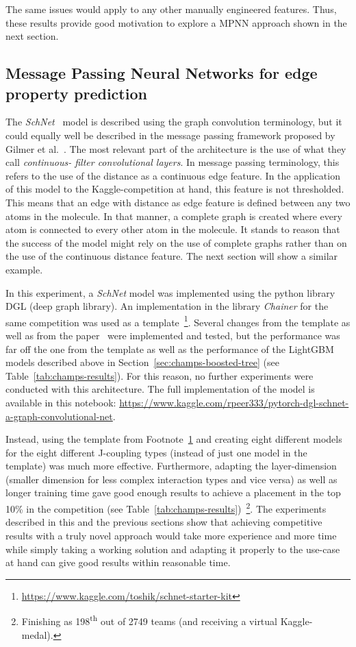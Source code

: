 The same issues would apply to any other manually engineered features. Thus, these results provide good motivation to explore a MPNN approach shown in the next section.


\subsection{Message Passing Neural Networks for edge property prediction}
\label{sec:schnet}

The \textit{SchNet}~\cite{Schutt2017} model is described using the graph convolution terminology, but it could equally well be described in the message passing framework proposed by Gilmer et al.~\cite{Gilmer2017}. The most relevant part of the architecture is the use of what they call \textit{continuous- filter convolutional layers}. In message passing terminology, this refers to the use of the distance as a continuous edge feature. In the application of this model to the Kaggle-competition at hand, this feature is not thresholded. This means that an edge with distance as edge feature is defined between any two atoms in the molecule. In that manner, a complete graph is created where every atom is connected to every other atom in the molecule. It stands to reason that the success of the model might rely on the use of complete graphs rather than on the use of the continuous distance feature. The next section will show a similar example.

In this experiment, a \textit{SchNet} model was implemented using the python library DGL (deep graph library). An implementation in the library \textit{Chainer} for the same competition was used as a template~\footnote{\label{fn:chainer-schnet}\url{https://www.kaggle.com/toshik/schnet-starter-kit}}. Several changes from the template as well as from the paper~\cite{Schutt2017} were implemented and tested, but the performance was far off the one from the template as well as the performance of the LightGBM models described above in Section~\ref{sec:champs-boosted-tree} (see Table~\ref{tab:champs-results}). For this reason, no further experiments were conducted with this architecture. The full implementation of the model is available in this notebook: \url{https://www.kaggle.com/rpeer333/pytorch-dgl-schnet-a-graph-convolutional-net}.

Instead, using the template from Footnote~\ref{fn:chainer-schnet} and creating eight different models for the eight different J-coupling types (instead of just one model in the template) was much more effective. Furthermore, adapting the layer-dimension (smaller dimension for less complex interaction types and vice versa) as well as longer training time gave good enough results to achieve a placement in the top 10\% in the competition (see Table~\ref{tab:champs-results})~\footnote{
	Finishing as 198\textsuperscript{th} out of 2749 teams (and receiving a virtual Kaggle-medal).
}. The experiments described in this and the previous sections show that achieving competitive results with a truly novel approach would take more experience and more time while simply taking a working solution and adapting it properly to the use-case at hand can give good results within reasonable time.


